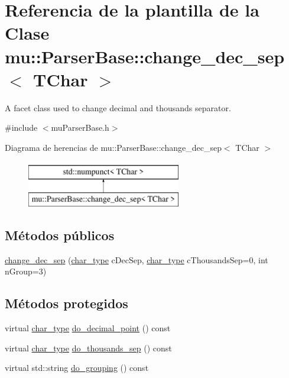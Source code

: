 \hypertarget{classmu_1_1_parser_base_1_1change__dec__sep}{}\section{Referencia de la plantilla de la Clase mu\+:\+:Parser\+Base\+:\+:change\+\_\+dec\+\_\+sep$<$ T\+Char $>$}
\label{classmu_1_1_parser_base_1_1change__dec__sep}


A facet class used to change decimal and thousands separator.  




{\ttfamily \#include $<$mu\+Parser\+Base.\+h$>$}

Diagrama de herencias de mu\+:\+:Parser\+Base\+:\+:change\+\_\+dec\+\_\+sep$<$ T\+Char $>$\begin{figure}[H]
\begin{center}
\leavevmode
\includegraphics[height=2.000000cm]{classmu_1_1_parser_base_1_1change__dec__sep}
\end{center}
\end{figure}
\subsection*{Métodos públicos}
\begin{DoxyCompactItemize}
\item 
\hyperlink{classmu_1_1_parser_base_1_1change__dec__sep_a6aaadeeb490e4ea39751171bc01d2815}{change\+\_\+dec\+\_\+sep} (\hyperlink{namespacemu_a81cc89a81a8872430ab1799b5848c5ca}{char\+\_\+type} c\+Dec\+Sep, \hyperlink{namespacemu_a81cc89a81a8872430ab1799b5848c5ca}{char\+\_\+type} c\+Thousands\+Sep=0, int n\+Group=3)
\end{DoxyCompactItemize}
\subsection*{Métodos protegidos}
\begin{DoxyCompactItemize}
\item 
virtual \hyperlink{namespacemu_a81cc89a81a8872430ab1799b5848c5ca}{char\+\_\+type} \hyperlink{classmu_1_1_parser_base_1_1change__dec__sep_a6aabf9d8bb74f9d7fdf151389d52faaa}{do\+\_\+decimal\+\_\+point} () const 
\item 
virtual \hyperlink{namespacemu_a81cc89a81a8872430ab1799b5848c5ca}{char\+\_\+type} \hyperlink{classmu_1_1_parser_base_1_1change__dec__sep_a9dbe274f34855814f2377aa35a5ee3c5}{do\+\_\+thousands\+\_\+sep} () const 
\item 
virtual std\+::string \hyperlink{classmu_1_1_parser_base_1_1change__dec__sep_a874ba5341350c67e211be8828c4c4962}{do\+\_\+grouping} () const 
\end{DoxyCompactItemize}


